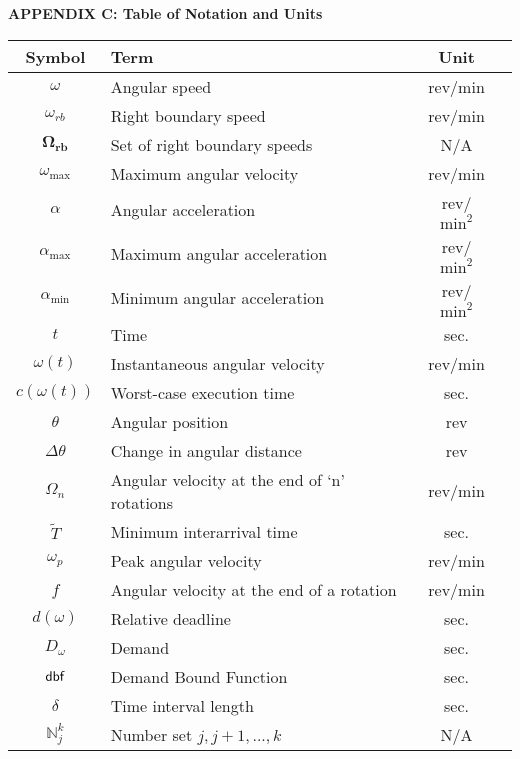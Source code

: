 
\centerline{\large\bf APPENDIX C: Table of Notation and Units}
\label{appendix:engCtrl-table-of-notation}

\begin{center}
\bgroup
\begin{tabular}{| c | l | c | c |}
    
    \hline			
    Symbol & Term & Unit \\  \hline \hline \cline{1-3}
    $\omega$ & Angular speed & rev/min \\ \cline{1-3}
    $\omega_{rb}$ & Right boundary speed & rev/min \\ \cline{1-3}
    $\mathbf{\Omega_{rb}}$ & Set of right boundary speeds & N/A \\ \cline{1-3}
    $\omega_{\max}$ & Maximum angular velocity & rev/min \\ \cline{1-3}
    $\alpha$ & Angular acceleration & rev/$\text{min}^2$ \\ \cline{1-3}
    $\alpha_{\max}$ & Maximum angular acceleration & rev/$\text{min}^2$ \\ \cline{1-3}
    $\alpha_{\min}$ & Minimum angular acceleration & rev/$\text{min}^2$ \\ \cline{1-3}
    $t$ & Time & sec. \\ \cline{1-3}
    $\omega(t)$ & Instantaneous angular velocity & rev/min \\ \cline{1-3}
    $c(\omega(t))$ & Worst-case execution time & sec. \\ \cline{1-3}
    $\theta$ & Angular position & rev \\ \cline{1-3}
    $\Delta \theta$ & Change in angular distance & rev \\ \cline{1-3}
    $\Omega_n$ & Angular velocity at the end of `n' rotations & rev/min \\ \cline{1-3}
    $\tilde{T}$ & Minimum interarrival time & sec. \\ \cline{1-3}
    $\omega_p$ & Peak angular velocity & rev/min \\ \cline{1-3}
    $f$ & Angular velocity at the end of a rotation & rev/min \\ \cline{1-3}
    $d(\omega)$ & Relative deadline & sec. \\ \cline{1-3}
    $D_\omega$ & Demand & sec. \\ \cline{1-3}
    $\mbox{\sf dbf}$ & Demand Bound Function & sec. \\ \cline{1-3}
    $\delta$ & Time interval length & sec. \\ \cline{1-3}
    $\mathbb{N}_j^k$ & Number set ${j, j+1, ... , k}$& N/A \\ \cline{1-3}
    \hline  
\end{tabular}
\egroup
\end{center}

